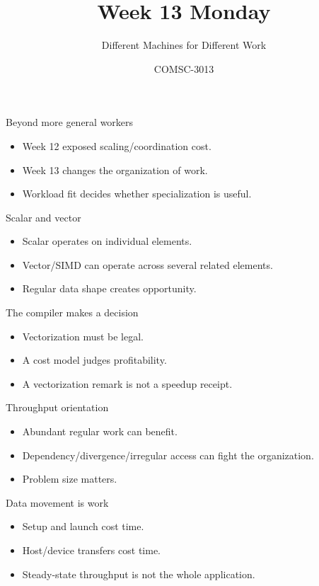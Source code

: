 \documentclass{beamer}
\title{Week 13 Monday}\subtitle{Different Machines for Different Work}\author{COMSC-3013}\date{}
\begin{document}
\begin{frame}\titlepage\end{frame}
\begin{frame}{Beyond more general workers}\begin{itemize}\item Week 12 exposed scaling/coordination cost.\item Week 13 changes the organization of work.\item Workload fit decides whether specialization is useful.\end{itemize}\end{frame}
\begin{frame}{Scalar and vector}\begin{itemize}\item Scalar operates on individual elements.\item Vector/SIMD can operate across several related elements.\item Regular data shape creates opportunity.\end{itemize}\end{frame}
\begin{frame}{The compiler makes a decision}\begin{itemize}\item Vectorization must be legal.\item A cost model judges profitability.\item A vectorization remark is not a speedup receipt.\end{itemize}\end{frame}
\begin{frame}{Throughput orientation}\begin{itemize}\item Abundant regular work can benefit.\item Dependency/divergence/irregular access can fight the organization.\item Problem size matters.\end{itemize}\end{frame}
\begin{frame}{Data movement is work}\begin{itemize}\item Setup and launch cost time.\item Host/device transfers cost time.\item Steady-state throughput is not the whole application.\end{itemize}\end{frame}
\end{document}
